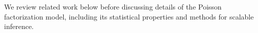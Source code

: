 

We review related work below before discussing details of the Poisson
factorization model, including its statistical properties and methods
for scalable inference.









